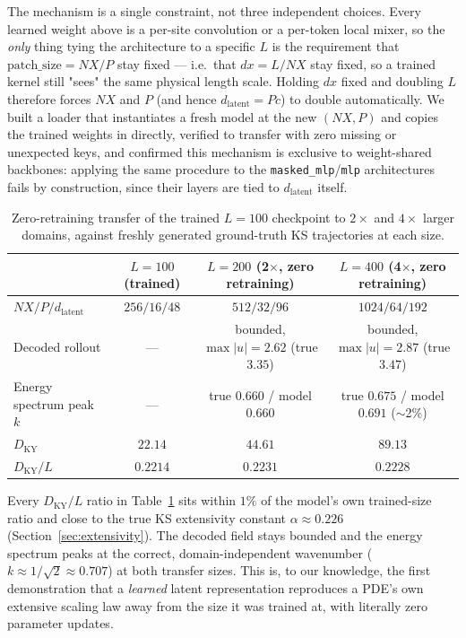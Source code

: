 \documentclass[11pt]{article}
\newcommand{\dlat}{d_{\mathrm{latent}}}
\begin{document}
The mechanism is a single constraint, not three independent choices.
Every learned weight above is a per-site convolution or a per-token
local mixer, so the \emph{only} thing tying the architecture to a
specific $L$ is the requirement that $\mathrm{patch\_size} = NX/P$ stay
fixed --- i.e.\ that $dx = L/NX$ stay fixed, so a trained kernel still
"sees" the same physical length scale. Holding $dx$ fixed and doubling
$L$ therefore forces $NX$ and $P$ (and hence $\dlat = Pc$) to double
automatically. We built a loader that instantiates a fresh model at the
new $(NX, P)$ and copies the trained weights in directly, verified to
transfer with zero missing or unexpected keys, and confirmed this
mechanism is exclusive to weight-shared backbones: applying the same
procedure to the \texttt{masked\_mlp}/\texttt{mlp} architectures fails
by construction, since their layers are tied to $\dlat$ itself.

\begin{table}[h]
\centering
\begin{tabular}{lccc}
\toprule
 & $L=100$ (trained) & $L=200$ (2$\times$, zero retraining) & $L=400$ (4$\times$, zero retraining) \\
\midrule
$NX / P / \dlat$ & $256/16/48$ & $512/32/96$ & $1024/64/192$ \\
Decoded rollout & --- & bounded, $\max|u|=2.62$ (true $3.35$) & bounded, $\max|u|=2.87$ (true $3.47$) \\
Energy spectrum peak $k$ & --- & true $0.660$ / model $0.660$ & true $0.675$ / model $0.691$ ($\sim$2\%) \\
$D_{\mathrm{KY}}$ & $22.14$ & $44.61$ & $89.13$ \\
$D_{\mathrm{KY}}/L$ & $\mathbf{0.2214}$ & $\mathbf{0.2231}$ & $\mathbf{0.2228}$ \\
\bottomrule
\end{tabular}
\caption{Zero-retraining transfer of the trained $L=100$ checkpoint to
$2\times$ and $4\times$ larger domains, against freshly generated
ground-truth KS trajectories at each size.}
\label{tab:transfer}
\end{table}

Every $D_{\mathrm{KY}}/L$ ratio in Table~\ref{tab:transfer} sits within
$1\%$ of the model's own trained-size ratio and close to the true KS
extensivity constant $\alpha \approx 0.226$ (Section~\ref{sec:extensivity}).
The decoded field stays bounded and the energy spectrum peaks at the
correct, domain-independent wavenumber ($k\approx 1/\sqrt2 \approx
0.707$) at both transfer sizes. This is, to our knowledge, the first
demonstration that a \emph{learned} latent representation reproduces a
PDE's own extensive scaling law away from the size it was trained at,
with literally zero parameter updates.
\end{document}
